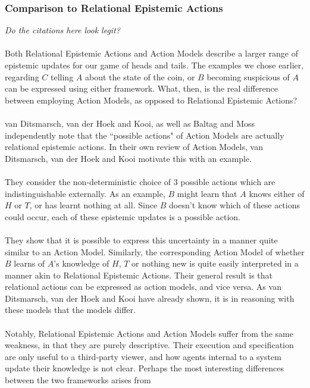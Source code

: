\documentclass[12pt, a4paper, twoside]{article}
\begin{document}
\subsubsection{Comparison to Relational Epistemic Actions} \label{epi_compare}
{\em Do the citations here look legit?}\\
\\
Both Relational Epistemic Actions and Action Models describe a larger range of
epistemic updates for our game of heads and tails.
The examples we chose earlier, regarding $C$ telling $A$ about the state of the
coin, or $B$ becoming suspicious of $A$ can be expressed using either framework.
What, then, is the real difference between employing Action Models, as opposed
to Relational Epistemic Actions?\\
\\
van Ditsmarsch, van der Hoek and Kooi, as well as Baltag and Moss independently
note that the ``possible actions" of Action Models  are actually relational
epistemic actions.
In their own review of Action Models, van Ditsmarsch, van der Hoek and Kooi
motivate this with an example. \citep{hoek2008dynamic,baltag2005programs}\\
\\
They consider the non-deterministic choice of 3 possible actions which are
indistinguishable externally.
As an example, $B$ might learn that $A$ knows either of $H$ or $T$, or has
learnt nothing at all.
Since $B$ doesn't know which of these actions could occur, each of these
epistemic updates is a possible action.\\
\\
They show that it is possible to express this uncertainty in a manner quite similar
to an Action Model.
Similarly, the corresponding Action Model of whether $B$ learns of $A$'s
knowledge of $H$, $T$ or nothing new is quite easily interpreted in a manner
akin to Relational Epistemic Actions.
Their general result is that relational actions can be expressed as action
models, and vice versa.
As van Ditsmarsch, van der Hoek and Kooi have already shown, it is in reasoning
with these models that the models differ.\\
\\
Notably, Relational Epistemic Actions and Action Models suffer from the same
weakness, in that they are purely descriptive.
Their execution and specification are only useful to a third-party viewer, and
how agents internal to a system update their knowledge is not clear.
Perhaps the most interesting differences between the two frameworks arises from
\end{document}
